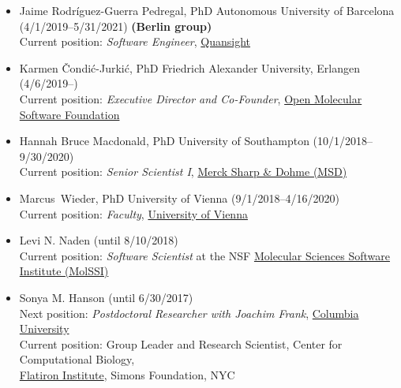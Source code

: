\documentclass[10pt]{article}
\begin{document}
\begin{itemize}
  \item Jaime Rodr\'{i}guez-Guerra Pedregal, PhD Autonomous University of Barcelona (4/1/2019--5/31/2021) {\bf (Berlin group)}\\
  Current position: \emph{Software Engineer}, \href{https://quansight.com/}{Quansight}

  \item Karmen \v{C}ondi\'{c}-Jurki\'{c}, PhD Friedrich Alexander University, Erlangen (4/6/2019--)\\
  Current position: \emph{Executive Director and Co-Founder}, \href{http://omsf.io}{Open Molecular Software Foundation}

  \item Hannah Bruce Macdonald, PhD University of Southampton (10/1/2018--9/30/2020)\\
  Current position: \emph{Senior Scientist I}, \href{http://www.merck.com}{Merck Sharp \& Dohme (MSD)}
  
  \item Marcus~Wieder, PhD University of Vienna (9/1/2018--4/16/2020)\\
  Current position: \emph{Faculty}, \href{https://www.univie.ac.at/en/}{University of Vienna}
  
  \item Levi N. Naden (until 8/10/2018)\\
  Current position: \emph{Software Scientist} at the NSF \href{http://molssi.org}{Molecular Sciences Software Institute (MolSSI)}
  
  \item Sonya M. Hanson (until 6/30/2017)\\
  Next position: \emph{Postdoctoral Researcher with Joachim Frank}, \href{http://franklab.cpmc.columbia.edu/franklab/}{{Columbia University}}\\
  Current position: Group Leader and Research Scientist, Center for Computational Biology, \\ \href{https://www.simonsfoundation.org/flatiron/}{Flatiron Institute}, Simons Foundation, NYC
 

\end{itemize}
\end{document}
